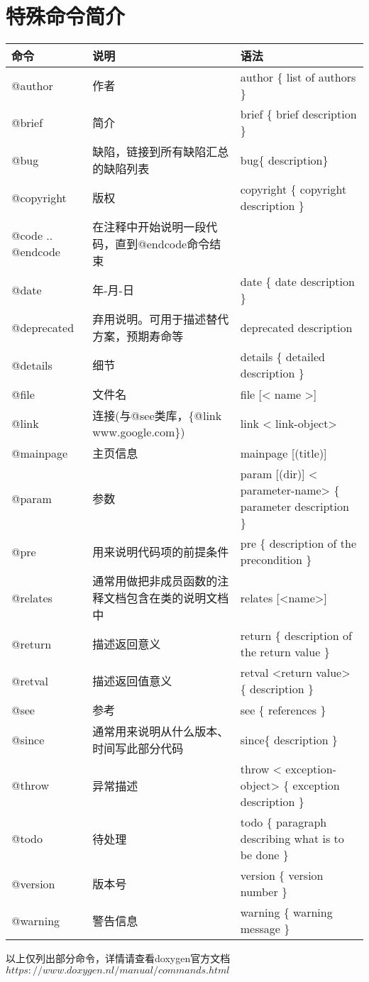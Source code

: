 \section{特殊命令简介}
\begin{center}
	\begin{tabular}{|p{2cm}|p{5cm}|p{7cm}|} \hline %
		\rowcolor{formalshade}
		\textbf{命令} & \textbf{说明} & \textbf{语法}  \\ \hline
		@author & 作者 & author \{ list of authors \}\\ \hline
		@brief &	简介&	brief \{ brief description \}\\ \hline
		@bug & 缺陷，链接到所有缺陷汇总的缺陷列表 & bug\{ description\}\\ \hline
		@copyright	&版权&	copyright \{ copyright description \}	\\ \hline
		@code .. @endcode &在注释中开始说明一段代码，直到@endcode命令结束& \\ \hline
		@date&	年-月-日 &	date \{ date description \}	 \\ \hline
		@deprecated	& 弃用说明。可用于描述替代方案，预期寿命等 &	deprecated { description }	\\ \hline
		@details &	细节 &	details \{ detailed description \}	\\ \hline
		@file & 文件名 & file [< name >]  \\ \hline
		@link &	连接(与@see类库，\{@link www.google.com\}) &	link < link-object>	\\ \hline
		@mainpage & 主页信息 & mainpage [(title)]\\ \hline
		@param &	参数&	param [(dir)] < parameter-name> \{ parameter description \}	\\ \hline
		@pre &用来说明代码项的前提条件&pre \{ description of the precondition \} \\ \hline
		@relates & 通常用做把非成员函数的注释文档包含在类的说明文档中 & relates [<name>] \\ \hline
		@return	&描述返回意义	& return \{ description of the return value \}	\\ \hline
		@retval	&描述返回值意义&	retval <return value> \{ description \}	\\ \hline
		@see &	参考 &	see \{ references \}	\\ \hline
		@since & 通常用来说明从什么版本、时间写此部分代码 & since\{ description \} \\ \hline
		@throw &	异常描述 &	throw < exception-object> \{ exception description \}	\\ \hline
		@todo &	待处理 &	todo \{ paragraph describing what is to be done \}	\\ \hline
		@version	&版本号 &	version \{ version number \}	\\ \hline
		@warning &	警告信息 &	warning \{ warning message \}	\\ \hline
	\end{tabular}
\end{center}
\begin{flushright}
	\fontsize{8pt}{5pt}
	以上仅列出部分命令，详情请查看doxygen官方文档\\$https://www.doxygen.nl/manual/commands.html$
\end{flushright}
